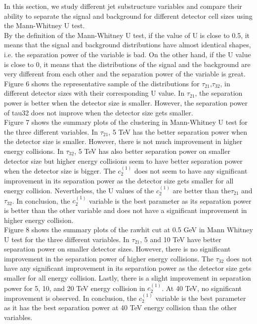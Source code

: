 In this section, we study different jet substructure variables and compare their ability to separate the signal and background for different detector cell sizes using the Mann-Whitney U test.\\

 By the definition of the Mann-Whitney U test, if the value of U is close to 0.5, it means that the signal and background distributions have almost identical shapes, i.e. the separation power of the variable is bad. On the other hand, if the U value is close to 0, it means that the distributions of the signal and the background are very different from each other and the separation power of the variable is great.\\
 
Figure 6 shows the representative sample of the distributions for $\tau_{21}$,$\tau_{32}$, in different detector sizes with their corresponding U value. In $\tau_{21}$, the separation power is better when the detector size is smaller. However, the separation power of tau32 does not improve when the detector size gets smaller.\\

Figure 7 shows the summary plots of the clustering in Mann-Whitney U test for the three different variables.  In $\tau_{21}$, 5 TeV has the better separation power when the detector size is smaller. However, there is not much improvement in higher energy collisions. In $\tau_{32}$, 5 TeV has also better separation power on smaller detector size but higher energy collisions seem to have better separation power when the detector size is bigger. The $c_2^{(1)}$ does not seem to have any significant improvement in its separation power as the detector size gets smaller for all energy collision. Nevertheless, the U values of the $c_2^{(1)}$ are better than the$\tau_{21}$ and $\tau_{32}$. In conclusion, the $c_2^{(1)}$ variable is the best parameter as its separation power is better than the other variable and does not have a significant improvement in higher energy collision.\\

Figure 8 shows the summary plots of the rawhit cut at 0.5 GeV in Mann Whitney U test for the three different variables. In $\tau_{21}$, 5 and 10 TeV have better separation power on smaller detector sizes. However, there is no significant improvement in the separation power of higher energy collisions. The $\tau_{32}$ does not have any significant improvement in its separation power as the detector size gets smaller for all energy collision. Lastly, there is a slight improvement in separation power for 5, 10, and 20 TeV energy collision in $c_2^{(1)}$. At 40 TeV, no significant improvement is observed. In conclusion, the $c_2^{(1)}$ variable is the best parameter as it has the best separation power at 40 TeV energy collision than the other variables.\\

